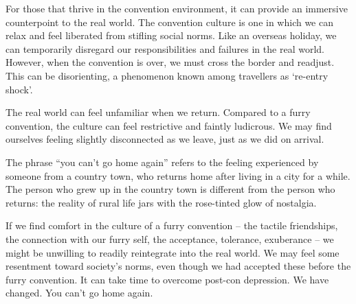 For those that thrive in the convention environment, it can provide an immersive counterpoint to the real world. The convention culture is one in which we can relax and feel liberated from stifling social norms. Like an overseas holiday, we can temporarily disregard our responsibilities and failures in the real world. However, when the convention is over, we must cross the border and readjust. This can be disorienting, a phenomenon known among travellers as `re-entry shock'.

The real world can feel unfamiliar when we return. Compared to a furry convention, the culture can feel restrictive and faintly ludicrous. We may find ourselves feeling slightly disconnected as we leave, just as we did on arrival.

The phrase “you can't go home again” refers to the feeling experienced by someone from a country town, who returns home after living in a city for a while. The person who grew up in the country town is different from the person who returns: the reality of rural life jars with the rose-tinted glow of nostalgia.

If we find comfort in the culture of a furry convention -- the tactile friendships, the connection with our furry self, the acceptance, tolerance, exuberance -- we might be unwilling to readily reintegrate into the real world. We may feel some resentment toward society's norms, even though we had accepted these before the furry convention. It can take time to overcome post-con depression. We have changed. You can't go home again.
